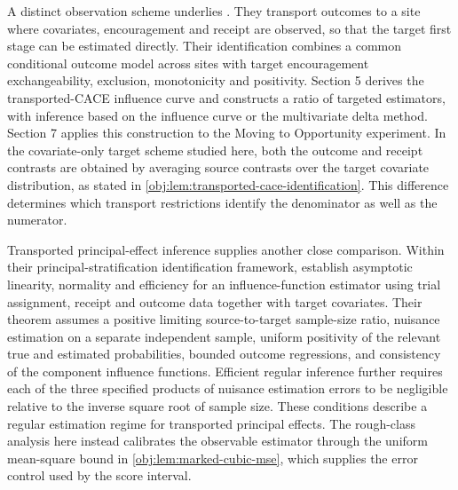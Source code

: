 \documentclass[11pt]{article}
\begin{document}
A distinct observation scheme underlies \citet[Sections 5 and 7]{RudolphVanDerLaan2017Robust}. They transport outcomes to a site where covariates, encouragement and receipt are observed, so that the target first stage can be estimated directly. Their identification combines a common conditional outcome model across sites with target encouragement exchangeability, exclusion, monotonicity and positivity. Section 5 derives the transported-CACE influence curve and constructs a ratio of targeted estimators, with inference based on the influence curve or the multivariate delta method. Section 7 applies this construction to the Moving to Opportunity experiment. In the covariate-only target scheme studied here, both the outcome and receipt contrasts are obtained by averaging source contrasts over the target covariate distribution, as stated in \cref{obj:lem:transported-cace-identification}. This difference determines which transport restrictions identify the denominator as well as the numerator.

Transported principal-effect inference supplies another close comparison. Within their principal-stratification identification framework, \citet[Theorem 6]{Clark2024} establish asymptotic linearity, normality and efficiency for an influence-function estimator using trial assignment, receipt and outcome data together with target covariates. Their theorem assumes a positive limiting source-to-target sample-size ratio, nuisance estimation on a separate independent sample, uniform positivity of the relevant true and estimated probabilities, bounded outcome regressions, and consistency of the component influence functions. Efficient regular inference further requires each of the three specified products of nuisance estimation errors to be negligible relative to the inverse square root of sample size. These conditions describe a regular estimation regime for transported principal effects. The rough-class analysis here instead calibrates the observable estimator through the uniform mean-square bound in \cref{obj:lem:marked-cubic-mse}, which supplies the error control used by the score interval.
\end{document}
